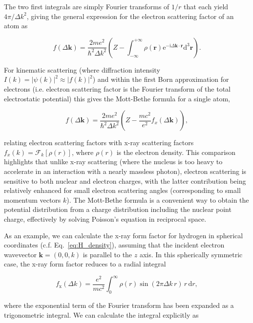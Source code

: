 \documentclass[%
 superscriptaddress,
 aip,
 amsmath,amssymb,
preprint,%
 author-year,%
longbibliography
]{revtex4-2}
\begin{document}
The two first integrals are simply Fourier transforms of $1/r$ that each yield $4 \pi / \Delta k^2$, giving the general expression for the electron scattering factor of an atom as

\begin{equation}
f(\Delta \bm{k})=\frac{2 m e^{2}}{\hbar^{2} \Delta k^{2}}\left(Z-\int_{-\infty}^{+\infty} \rho(\bm{r}) \mathrm{e}^{-\mathrm{i} \Delta \bm{k} \cdot \bm{r}} \mathrm{d}^{3} \bm{r}\right).
\end{equation}

For kinematic scattering (where diffraction intensity $I(k)=|\psi(k)|^{2}\approx\left|f(k)\right|^{2}$) and within the first Born approximation for electrons (i.e. electron scattering factor is the Fourier transform of the total electrostatic potential) this gives the Mott-Bethe formula for a single atom,

\begin{equation}
f(\Delta \bm{k})=\frac{2 m e^2}{\hbar^{2} \Delta k^{2}} \left(Z-\frac{m c^2}{e^2}f_{x}(\Delta \bm{k})\right),
\end{equation}

relating electron scattering factors with x-ray scattering factors $f_{x}(k)=\mathcal{F}_k[\rho(r)]$, where $\rho(r)$ is the electron density. This comparison highlights that unlike x-ray scattering (where the nucleus is too heavy to accelerate in an interaction with a nearly massless photon), electron scattering is sensitive to both nuclear and electron charges, with the latter contribution being relatively enhanced for small electron scattering angles (corresponding to small momentum vectors $k$). The Mott-Bethe formula is a convenient way to obtain the potential distribution from a charge distribution including the nuclear point charge, effectively by solving Poisson's equation in reciprocal space. 

As an example, we can calculate the x-ray form factor for hydrogen in spherical coordinates (c.f. Eq.~\ref{eq:H_density}), assuming that the incident electron wavevector $\bm{k} = (0, 0, k)$ is parallel to the $z$ axis. In this spherically symmetric case, the x-ray form factor reduces to a radial integral

\begin{equation}
f_\mathrm{x}(\Delta k)=\frac{e^2}{m c^2} \int_{0}^{\infty} \rho(r) \sin (2 \pi \Delta k\, r)\, r\, \mathrm{d}r,
\end{equation}

where the exponential term of the Fourier transform has been expanded as a trigonometric integral. We can calculate the integral explicitly as
\end{document}

